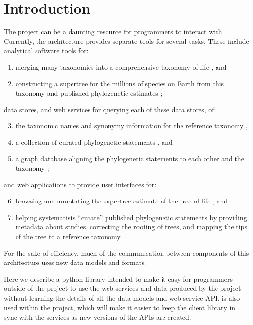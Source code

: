 \section{Introduction}
The \otol project can be a daunting resource for programmers to interact with.
Currently, the architecture provides separate tools for several tasks.
These include analytical software tools for:
\begin{enumerate}
    \item merging many taxonomies into a comprehensive taxonomy of life \citep{smasher}, and
    \item constructing a supertree for the millions of species on Earth from this 
        taxonomy and published phylogenetic estimates \citep{SmithHB2013};
\end{enumerate}
data stores, and web services for querying each of these data stores, of:
\begin{enumerate}
   \setcounter{enumi}{2}
    \item the taxonomic names and synonymy information for the reference taxonomy \citep{OTT,taxomachine},
    \item a collection of curated phylogenetic statements \citep{phylesystem}, and
    \item a graph database aligning the phylogenetic statements to each other and the taxonomy \citep{treemachine,SmithHB2013};
\end{enumerate}
 and web applications to provide user interfaces for:
\begin{enumerate}
   \setcounter{enumi}{5}
    \item browsing and annotating the supertree estimate of the tree of life \citep{otolbrowser}, and
    \item helping systematists ``curate'' published phylogenetic statements by providing
        metadata about studies, correcting the rooting of trees, and mapping the tips
        of the tree to a reference taxonomy \citep{otolcurator}.
\end{enumerate}
For the sake of efficiency, much of the communication between components of this architecture
uses new data models and formats.

Here we describe a python library intended to make it easy for programmers outside
    of the \otol project to use the web services and data produced by the project without
    learning the details of all the data models and web-service API.
\Pey is also used within the project, which will make it easier to keep the client library
     in sync with the services as new versions of the \otol APIs are created.


